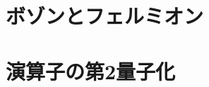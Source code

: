 \documentclass{report}
\begin{document}
  \maketitle
  \tableofcontents
  \section{ボゾンとフェルミオン}
    
  \section{演算子の第2量子化}
    
\end{document}
